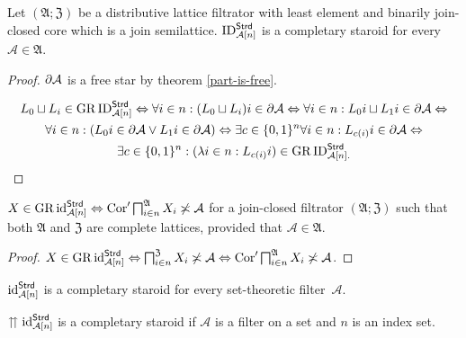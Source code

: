 \begin{prop}
\label{ID-completary}Let $(\mathfrak{A};\mathfrak{Z})$ be a distributive
lattice filtrator with least element and binarily join-closed core
which is a join semilattice. $\operatorname{ID}_{\mathcal{A}[n]}^{\mathsf{Strd}}$
is a completary staroid for every $\mathcal{A}\in\mathfrak{A}$.\end{prop}
\begin{proof}
$\partial\mathcal{A}$ is a free star by theorem \ref{part-is-free}.

\begin{multline*}
L_{0}\sqcup L_{i}\in\operatorname{GR}\operatorname{ID}_{\mathcal{A}[n]}^{\mathsf{Strd}}\Leftrightarrow\forall i\in n:(L_{0}\sqcup L_{i})i\in\partial\mathcal{A}\Leftrightarrow\forall i\in n:L_{0}i\sqcup L_{1}i\in\partial\mathcal{A}\Leftrightarrow\\
\forall i\in n:(L_{0}i\in\partial\mathcal{A}\vee L_{1}i\in\partial\mathcal{A})\Leftrightarrow\exists c\in\{0,1\}^{n}\forall i\in n:L_{c(i)}i\in\partial\mathcal{A}\Leftrightarrow\\
\exists c\in\{0,1\}^{n}:(\lambda i\in n:L_{c(i)}i)\in\operatorname{GR}\operatorname{ID}_{\mathcal{A}[n].}^{\mathsf{Strd}}
\end{multline*}
\end{proof}
\begin{lem}
$X\in\operatorname{GR}\operatorname{id}_{\mathcal{A}[n]}^{\mathsf{Strd}}\Leftrightarrow\operatorname{Cor}'\bigsqcap_{i\in n}^{\mathfrak{A}}X_{i}\not\asymp\mathcal{A}$
for a join-closed filtrator $(\mathfrak{A};\mathfrak{Z})$ such that
both $\mathfrak{A}$ and $\mathfrak{Z}$ are complete lattices, provided
that $\mathcal{A}\in\mathfrak{A}$.\end{lem}
\begin{proof}
$X\in\operatorname{GR}\operatorname{id}_{\mathcal{A}[n]}^{\mathsf{Strd}}\Leftrightarrow\bigsqcap_{i\in n}^{\mathfrak{Z}}X_{i}\not\asymp\mathcal{A}\Leftrightarrow\operatorname{Cor}'\bigsqcap_{i\in n}^{\mathfrak{A}}X_{i}\not\asymp\mathcal{A}$.\end{proof}
\begin{conjecture}
$\operatorname{id}_{\mathcal{A}[n]}^{\mathsf{Strd}}$ is a completary staroid for
every set-theoretic filter~$\mathcal{A}$.

$\upuparrows\operatorname{id}_{\mathcal{A}[n]}^{\mathsf{Strd}}$ is a completary
staroid if $\mathcal{A}$ is a filter on a set and $n$ is an index
set.
\end{conjecture}

